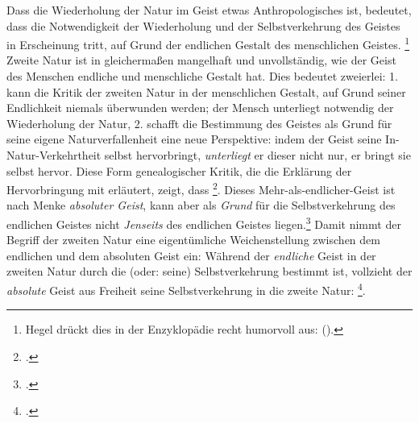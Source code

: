 \documentclass[12pt, a4paper, openany]{report}
\begin{document}
Dass die Wiederholung der Natur im Geist etwas Anthropologisches ist, bedeutet, dass die Notwendigkeit der Wiederholung und der Selbstverkehrung des Geistes in Erscheinung tritt, auf Grund der endlichen Gestalt des menschlichen Geistes.%
\footnote{
    Hegel drückt dies in der Enzyklopädie recht humorvoll aus:  (\cite[][§ 410 (Anmerkung), S. 186]{hegel_enzyklopädie_1969}).
}
Zweite Natur ist in gleichermaßen mangelhaft und unvollständig, wie der Geist des Menschen endliche und menschliche Gestalt hat.
Dies bedeutet zweierlei: 
1. kann die Kritik der zweiten Natur in der menschlichen Gestalt, auf Grund seiner Endlichkeit niemals überwunden werden;
der Mensch unterliegt notwendig der Wiederholung der Natur,
2. schafft die Bestimmung des Geistes als Grund für seine eigene Naturverfallenheit eine neue Perspektive: 
indem der Geist seine In-Natur-Verkehrtheit selbst hervorbringt, \emph{unterliegt} er dieser nicht nur, er bringt sie selbst hervor.
Diese Form genealogischer Kritik, die die Erklärung der Hervorbringung mit erläutert, zeigt, dass \footcite[][140]{menke_autonomie_2018}.
Dieses Mehr-als-endlicher-Geist ist nach Menke \emph{absoluter Geist}, kann aber als \emph{Grund} für die Selbstverkehrung des endlichen Geistes nicht \emph{Jenseits} des endlichen Geistes liegen.\footcite[Vgl.][140]{menke_autonomie_2018}
Damit nimmt der Begriff der zweiten Natur eine eigentümliche Weichenstellung zwischen dem endlichen und dem absoluten Geist ein:
Während der \emph{endliche} Geist in der zweiten Natur durch die (oder: seine) Selbstverkehrung bestimmt ist, vollzieht der \emph{absolute} Geist aus Freiheit seine Selbstverkehrung in die zweite Natur:
\footcite[Vgl.][140]{menke_autonomie_2018}.\\
\end{document}
